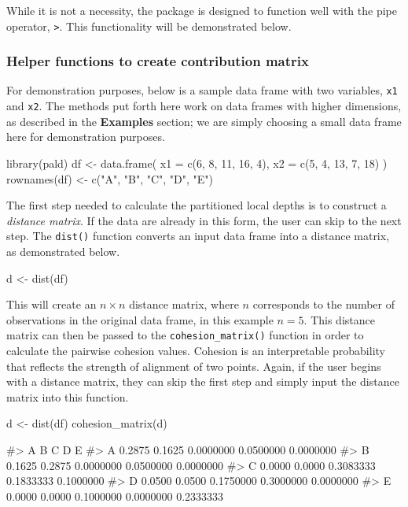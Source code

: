 While it is not a necessity, the  package is designed to
function well with the pipe operator, \texttt{\textbar{}\textgreater{}}.
This functionality will be demonstrated below.

\hypertarget{helper-functions-to-create-contribution-matrix}{%
\subsubsection{Helper functions to create contribution
matrix}\label{helper-functions-to-create-contribution-matrix}}

For demonstration purposes, below is a sample data frame with two
variables, \texttt{x1} and \texttt{x2}. The methods put forth here work
on data frames with higher dimensions, as described in the
\textbf{Examples} section; we are simply choosing a small data frame
here for demonstration purposes.

\begin{Schunk}
\begin{Sinput}
library(pald)
df <- data.frame(
  x1 = c(6, 8, 11, 16, 4),
  x2 = c(5, 4, 13, 7, 18)
)
rownames(df) <- c("A", "B", "C", "D", "E")
\end{Sinput}
\end{Schunk}

The first step needed to calculate the partitioned local depths is to
construct a \emph{distance matrix}. If the data are already in this
form, the user can skip to the next step. The \texttt{dist()} function
converts an input data frame into a distance matrix, as demonstrated
below.

\begin{Schunk}
\begin{Sinput}
d <- dist(df)
\end{Sinput}
\end{Schunk}

This will create an \(n\times n\) distance matrix, where \(n\)
corresponds to the number of observations in the original data frame, in
this example \(n = 5\). This distance matrix can then be passed to the
\texttt{cohesion\_matrix()} function in order to calculate the pairwise
cohesion values. Cohesion is an interpretable probability that reflects
the strength of alignment of two points. Again, if the user begins with
a distance matrix, they can skip the first step and simply input the
distance matrix into this function.

\begin{Schunk}
\begin{Sinput}
d <- dist(df)
cohesion_matrix(d)
\end{Sinput}
\begin{Soutput}
#>        A      B         C         D         E
#> A 0.2875 0.1625 0.0000000 0.0500000 0.0000000
#> B 0.1625 0.2875 0.0000000 0.0500000 0.0000000
#> C 0.0000 0.0000 0.3083333 0.1833333 0.1000000
#> D 0.0500 0.0500 0.1750000 0.3000000 0.0000000
#> E 0.0000 0.0000 0.1000000 0.0000000 0.2333333
\end{Soutput}
\end{Schunk}

